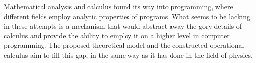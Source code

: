 Mathematical analysis and calculus found its way into programming, where different fields employ analytic properties of programs. What seems to be lacking in these attempts is a mechanism that would abstract away the gory details of calculus and provide the ability to employ it on a higher level in computer programming. The proposed theoretical model and the constructed operational calculus aim to fill this gap, in the same way as it has done in the field of physics.










